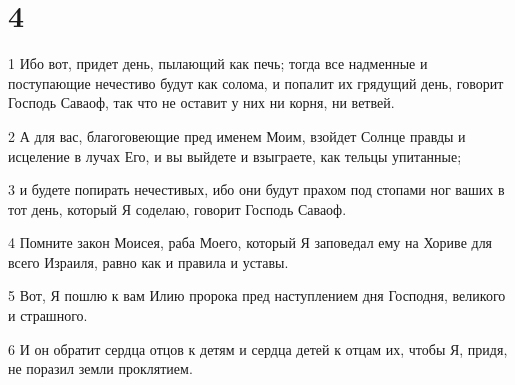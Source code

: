 \chapter{4}

\par 1 Ибо вот, придет день, пылающий как печь; тогда все надменные и поступающие нечестиво будут как солома, и попалит их грядущий день, говорит Господь Саваоф, так что не оставит у них ни корня, ни ветвей.
\par 2 А для вас, благоговеющие пред именем Моим, взойдет Солнце правды и исцеление в лучах Его, и вы выйдете и взыграете, как тельцы упитанные;
\par 3 и будете попирать нечестивых, ибо они будут прахом под стопами ног ваших в тот день, который Я соделаю, говорит Господь Саваоф.
\par 4 Помните закон Моисея, раба Моего, который Я заповедал ему на Хориве для всего Израиля, равно как и правила и уставы.
\par 5 Вот, Я пошлю к вам Илию пророка пред наступлением дня Господня, великого и страшного.
\par 6 И он обратит сердца отцов к детям и сердца детей к отцам их, чтобы Я, придя, не поразил земли проклятием.


